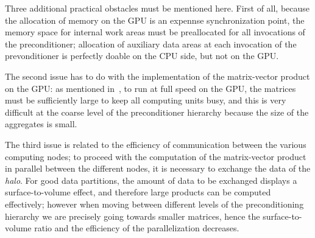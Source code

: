 Three additional practical obstacles must be mentioned here. 
First of all,  because the allocation of memory
on the GPU is an expennse synchronization point,  the
memory space for internal work areas must be preallocated for all
invocations  of the preconditioner; allocation of auxiliary data areas at
each invocation of the prevonditioner is perfectly doable on the CPU
side, but not  on the GPU. 

The second issue has to do with the implementation of the
matrix-vector product on the GPU: as mentioned
in~\cite{Filippone:2017:SMM:3034774.3017994}, to run at full speed on
the GPU, the matrices must be  sufficiently large to keep all
computing units busy, and this is very difficult at the coarse level
of the preconditioner hierarchy because the size of the aggregates is
small. 

The third issue is related to the efficiency of communication between
the various computing nodes; to proceed with the computation of the
matrix-vector product in parallel between the different nodes, it is
necessary to exchange the data of the \emph{halo}. For good data
partitions, the amount of data to be exchanged displays a
surface-to-volume effect, and therefore large products can be computed
effectively; however when moving between different levels of the
preconditioning hierarchy we are precisely going towards smaller
matrices, hence the surface-to-volume ratio and the efficiency of the
parallelization decreases. %
